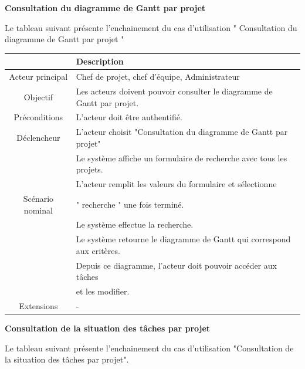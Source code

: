 \newpage
\par \textbf{  	 	Consultation du diagramme de Gantt par projet	}
\par Le tableau suivant présente l’enchainement du cas d’utilisation " Consultation du diagramme de Gantt par projet "
\begin{center}
\begin{tabular}{|c|l|}
\hline 
&\textbf { Description }\\\hline 
    Acteur principal & Chef de projet, chef d’équipe, Administrateur \\\hline 
    Objectif&Les acteurs doivent pouvoir consulter le diagramme de Gantt par projet.\\\hline
    Préconditions&L’acteur doit être authentifié.  \\\hline 
    Déclencheur&L’acteur choisit "Consultation du diagramme de Gantt par projet"\\\hline 
    &Le système affiche un formulaire de recherche avec tous les projets.    \\
    &L'acteur remplit les valeurs du formulaire et sélectionne   \\
    Scénario nominal&" recherche " une fois terminé. \\
    &Le système effectue la recherche.    \\
    & Le système retourne le diagramme de Gantt qui correspond aux critères.   \\
    &Depuis ce diagramme, l’acteur doit pouvoir accéder aux tâches   \\
    &et les modifier.\\\hline
    Extensions&                    - \\\hline
\end{tabular}
\label{desc_diag_gantt}
\end{center}
\newpage
\par \textbf{  	 	 	Consultation de la situation des tâches par projet	}
\par Le tableau suivant présente l’enchainement du cas d’utilisation "Consultation de la situation des tâches par projet".
